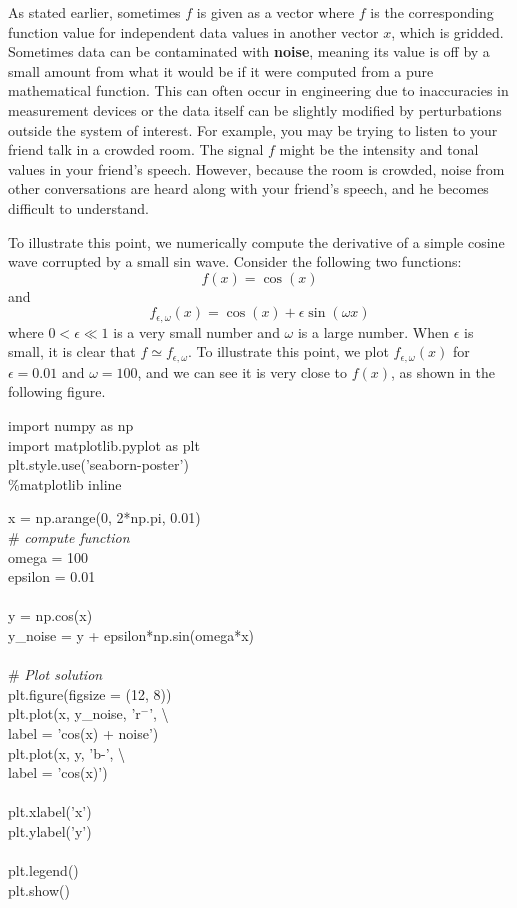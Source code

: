 As stated earlier, sometimes $f$ is given as a vector where $f$ is the corresponding function value for independent data values in another vector $x$, which is gridded. Sometimes data can be contaminated with {\bf noise}, meaning its value is off by a small amount from what it would be if it were computed from a pure mathematical function. This can often occur in engineering due to inaccuracies in measurement devices or the data itself can be slightly modified by perturbations outside the system of interest. For example, you may be trying to listen to your friend talk in a crowded room. The signal $f$ might be the intensity and tonal values in your friend’s speech. However, because the room is crowded, noise from other conversations are heard along with your friend’s speech, and he becomes difficult to understand.

To illustrate this point, we numerically compute the derivative of a simple cosine wave corrupted by a small sin wave. Consider the following two functions:
\[f(x)=\cos(x)\]
and
\[f_{\epsilon,\omega}(x)=\cos(x)+\epsilon\sin(\omega x)\]
where $0<\epsilon\ll1$ is a very small number and $\omega$ is a large number. When $\epsilon$ is small, it is clear that $f\simeq f_{\epsilon,\omega}$. To illustrate this point, we plot $f_{\epsilon,\omega}(x)$ for $\epsilon=0.01$ and $\omega=100$, and we can see it is very close to $f(x)$, as shown in the following figure.

\begin{boxB}
import numpy as np\\
import matplotlib.pyplot as plt\\
plt.style.use('seaborn-poster')\\
\%matplotlib inline
\end{boxB}

\begin{boxB}
x = np.arange(0, 2*np.pi, 0.01) \\
\# {\it compute function}\\
omega = 100\\
epsilon = 0.01\\
\\
y = np.cos(x) \\
y\_noise = y + epsilon*np.sin(omega*x)\\
\\
\# {\it Plot solution}\\
plt.figure(figsize = (12, 8))\\
plt.plot(x, y\_noise, 'r$^-$', \textbackslash \\
         \hspace*{1.5cm}label = 'cos(x) + noise')\\
plt.plot(x, y, 'b-', \textbackslash \\
         \hspace*{1.5cm}label = 'cos(x)')\\
\\
plt.xlabel('x')\\
plt.ylabel('y')\\
\\
plt.legend()\\
plt.show()\\
\end{boxB}

